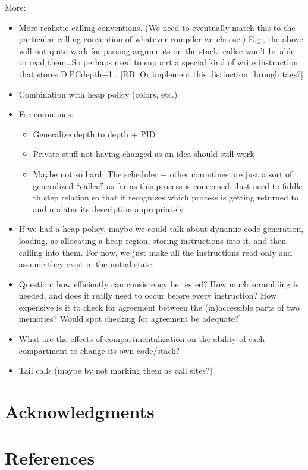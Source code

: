 \documentclass[conference]{IEEEtran}
\begin{document}
More:
\begin{itemize}
\item More realistic calling conventions.  (We need to eventually match this to the particular calling convention of whatever compiler we choose.)  E.g., the above will not quite work for passing arguments on the stack: callee won’t be able to read them…So perhaps need to support a special kind of write instruction that stores D.PCdepth+1 . [RB: Or implement this distinction through tags?]
\item Combination with heap policy (colors, etc.)
\item For coroutines:
\begin{itemize}
\item Generalize depth to depth + PID
\item Private stuff not having changed as an idea should still work
\item Maybe not so hard: The scheduler + other coroutines are just a sort of generalized “callee” as far as this process is concerned.  Just need to fiddle th step relation so that it recognizes which process is getting returned to and updates its description appropriately.
\end{itemize}
\item If we had a heap policy, maybe we could talk about dynamic code generation, loading, as allocating a heap region, storing instructions into it, and then calling into them.  For now, we just make all the instructions read only and assume they exist in the initial state.
\item Question: how efficiently can consistency be tested? How much scrambling is needed, and does it really need to occur before every instruction? How expensive is it to check for agreement between the (in)accessible parts of two memories?  Would spot checking for agreement be adequate?]
\item What are the effects of compartmentalization on the ability of each compartment to change its own code/stack?
\item Tail calls (maybe by not marking them as call sites?)
\end{itemize}

\section*{Acknowledgments}
\fi

\section*{References}

% 
\end{document}
